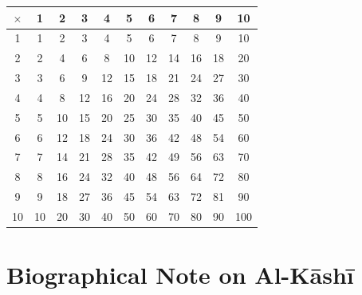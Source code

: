 \documentclass[11pt,a4paper]{article}
\begin{document}
\begin{center}

\begin{tabular}{|c|cccccccccc|}

\hline

$\times$ & 1 & 2 & 3 & 4 & 5 & 6 & 7 & 8 & 9 & 10 \\

\hline

1 & 1 & 2 & 3 & 4 & 5 & 6 & 7 & 8 & 9 & 10 \\

2 & 2 & 4 & 6 & 8 & 10 & 12 & 14 & 16 & 18 & 20 \\

3 & 3 & 6 & 9 & 12 & 15 & 18 & 21 & 24 & 27 & 30 \\

4 & 4 & 8 & 12 & 16 & 20 & 24 & 28 & 32 & 36 & 40 \\

5 & 5 & 10 & 15 & 20 & 25 & 30 & 35 & 40 & 45 & 50 \\

6 & 6 & 12 & 18 & 24 & 30 & 36 & 42 & 48 & 54 & 60 \\

7 & 7 & 14 & 21 & 28 & 35 & 42 & 49 & 56 & 63 & 70 \\

8 & 8 & 16 & 24 & 32 & 40 & 48 & 56 & 64 & 72 & 80 \\

9 & 9 & 18 & 27 & 36 & 45 & 54 & 63 & 72 & 81 & 90 \\

10 & 10 & 20 & 30 & 40 & 50 & 60 & 70 & 80 & 90 & 100 \\

\hline

\end{tabular}

\end{center}

\clearpage






\appendix

\section{Biographical Note on Al-K\=ash\=i}
\end{document}
